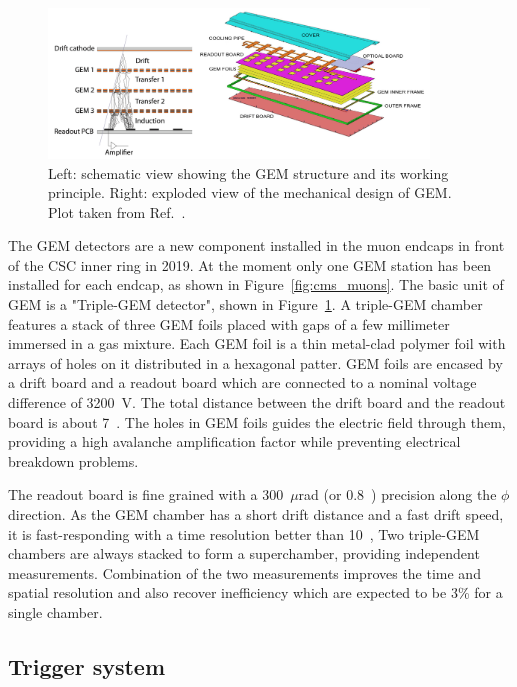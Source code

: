 \begin{figure}[!htb]
    \centering
    \captionsetup{justification=justified}
    \includegraphics[width=0.90\textwidth]{pics/LHC_CMS/GEM.png}
    \caption{Left: schematic view showing the GEM structure and its working principle.
             Right: exploded view of the mechanical design of GEM.
             Plot taken from Ref.~\cite{Colaleo:2021453}.}
    \label{fig:cms_gem}
\end{figure}

The GEM detectors are a new component installed in the muon endcaps in front of the CSC inner ring in 2019.
At the moment only one GEM station has been installed for each endcap, as shown in Figure~\ref{fig:cms_muons}.
The basic unit of GEM is a "Triple-GEM detector", shown in Figure~\ref{fig:cms_gem}.
A triple-GEM chamber features a stack of three GEM foils placed with gaps of a few millimeter immersed in a gas mixture.
Each GEM foil is a thin metal-clad polymer foil with arrays of holes on it distributed in a hexagonal patter. 
GEM foils are encased by a drift board and a readout board which are connected to a nominal voltage difference of 3200~V.
The total distance between the drift board and the readout board is about 7~\mm.
The holes in GEM foils guides the electric field through them, providing a high avalanche amplification factor while preventing electrical breakdown problems.

The readout board is fine grained with a 300~$\mu$rad (or 0.8~\mm) precision along the $\phi$ direction.
As the GEM chamber has a short drift distance and a fast drift speed, it is fast-responding with a time resolution better than 10~\ns, 
Two triple-GEM chambers are always stacked to form a superchamber, providing independent measurements.
Combination of the two measurements improves the time and spatial resolution and also recover inefficiency which are expected to be 3\% for a single chamber.

\subsection{Trigger system}\label{sec:trigger}

